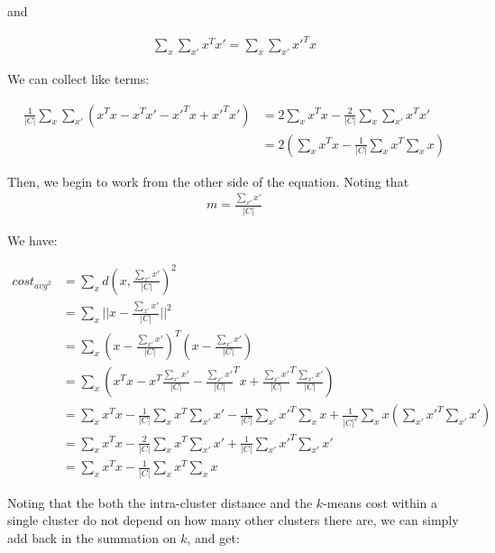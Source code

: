 \documentclass{article}
\begin{document}
\begin{enumerate}
and 

\begin{align*}
  \sum\limits_{x} \sum\limits_{x'} x^Tx' = \sum\limits_{x} \sum\limits_{x'} x'^Tx
\end{align*}


We can collect like terms:

\begin{align*}
  \frac 1 {|C|} \sum\limits_{x} \sum\limits_{x'} (x^Tx - x^Tx' - x'^Tx + x'^Tx') &= 2\sum\limits_x x^Tx - \frac 2 {|C|} \sum\limits_{x} \sum\limits_{x'} x^Tx'\\
   &= 2(\sum\limits_x x^Tx - \frac 1 {|C|} \sum\limits_{x} x^T \sum\limits_{x} x)
 \end{align*}
 
Then, we begin to work from the other side of the equation. Noting
that 
\begin{align*}
  m = \frac {\sum\limits_{x'} x'} {|C|}
\end{align*}

We have:

\begin{align*}
  cost_{avg^2} &= \sum\limits_{x} d(x, \frac {\sum\limits_{x'} x'} {|C|})^2\\
  &= \sum\limits_{x} ||x - \frac {\sum\limits_{x'} x'} {|C|}||^2\\
  &= \sum\limits_{x} (x - \frac {\sum\limits_{x'} x'} {|C|})^T (x - \frac {\sum\limits_{x'} x'} {|C|})\\
    &= \sum\limits_{x} (x^Tx - x^T \frac {\sum\limits_{x'} x'} {|C|} - \frac {\sum\limits_{x'} x'} {|C|}^Tx + \frac {\sum\limits_{x'} x'} {|C|}^T \frac {\sum\limits_{x'} x'} {|C|})\\
    &= \sum\limits_{x} x^Tx - \frac 1 {|C|} \sum\limits_{x} x^T \sum\limits_{x'} x' -  \frac 1 {|C|}  \sum\limits_{x'} x'^T \sum\limits_{x} x +  \frac 1 {|C|^2} \sum\limits_{x} x (\sum\limits_{x'} x'^T \sum\limits_{x'} x')\\
   &= \sum\limits_{x} x^Tx - \frac 2 {|C|} \sum\limits_{x} x^T \sum\limits_{x'} x' +  \frac 1 {|C|} \sum\limits_{x'} x'^T \sum\limits_{x'} x'\\
   &= \sum\limits_{x} x^Tx - \frac 1 {|C|} \sum\limits_{x} x^T \sum\limits_{x} x 
\end{align*}

Noting that the both the
intra-cluster distance and the $k$-means cost within a single cluster
do not depend on how many other clusters there are, we can simply add
back in the summation on $k$, and get:


\end{enumerate}
\end{document}
